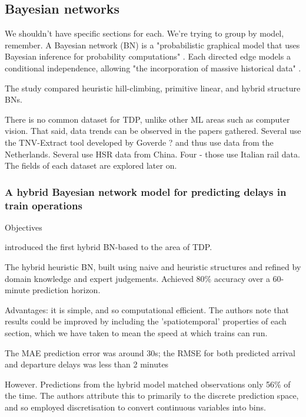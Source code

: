 \documentclass{article}
\begin{document}
\subsection{Bayesian networks}

We shouldn't have specific sections for each. We're trying to group by model, remember. 
A Bayesian network (BN) is a "probabilistic graphical model that uses Bayesian inference for probability computations" \cite{towards_data_science_BN_intro}. Each directed edge models a conditional independence, allowing "the incorporation of massive historical data" \cite{lessan_fu_wen_2019}.

The study compared heuristic hill-climbing, primitive linear, and hybrid structure BNs.

There is no common dataset for TDP, unlike other ML areas such as computer vision. That said, data trends can be observed in the papers gathered. Several use the TNV-Extract tool developed by Goverde ? and thus use data from the Netherlands. Several use HSR data from China. Four - those use Italian rail data. The fields of each dataset are explored later on. 

\subsubsection{A hybrid Bayesian network model for predicting delays in train operations \cite{lessan_fu_wen_2019}}

Objectives

 introduced the first hybrid BN-based to the area of TDP. 

The hybrid heuristic BN, built using naive and heuristic structures and refined by domain knowledge and expert judgements.
Achieved 80\% accuracy over a 60-minute prediction horizon. 

Advantages: it is simple, and so computational efficient.
The authors note that results could be improved by including the 'spatiotemporal' properties of each section, which we have taken to mean the speed at which trains can run. 

The MAE prediction error was around 30s; the RMSE for both predicted arrival and departure delays was less than 2 minutes

However. Predictions from the hybrid model matched observations only 56\% of the time. The authors attribute this to primarily to the discrete prediction space, and so employed discretisation to convert continuous variables into bins.  
\end{document}
